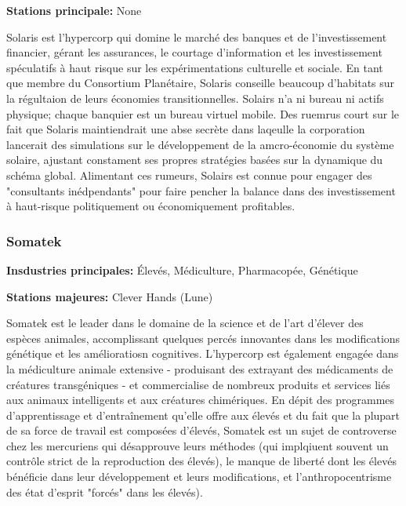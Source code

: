 \textbf{Stations principale:} None 

Solaris est l'hypercorp qui domine le marché des banques et de l'investissement financier, gérant les assurances, le courtage d'information et les investissement spéculatifs à haut risque sur les expérimentations culturelle et sociale. En tant que membre du Consortium Planétaire, Solaris conseille beaucoup d'habitats sur la régultaion de leurs économies transitionnelles. Solairs n'a ni bureau ni actifs physique; chaque banquier est un bureau virtuel mobile. Des ruemrus court sur le fait que Solaris maintiendrait une abse secrète dans laqeulle la corporation lancerait des simulations sur le développement de la amcro-économie du système solaire, ajustant constament ses propres stratégies basées sur la dynamique du schéma global. Alimentant ces rumeurs, Solairs est connue pour engager des "consultants inédpendants" pour faire pencher la balance dans des investissement à haut-risque politiquement ou économiquement profitables. 

\subsubsection{Somatek} \label{sec:somatek} 

\textbf{Insdustries principales:} Élevés, Médiculture, Pharmacopée, Génétique 

\textbf{Stations majeures:} Clever Hands (Lune) 

Somatek est le leader dans le domaine de la science et de l'art d'élever des espèces animales, accomplissant quelques percés innovantes dans les modifications génétique et les amélioratiosn cognitives. L'hypercorp est également engagée dans la médiculture animale extensive - produisant des extrayant des médicaments de créatures transgéniques - et commercialise de nombreux produits et services liés aux animaux intelligents et aux créatures chimériques. En dépit des programmes d'apprentissage et d'entraînement qu'elle offre aux élevés et du fait que la plupart de sa force de travail est composées d'élevés, Somatek est un sujet de controverse chez les mercuriens qui désapprouve leurs méthodes (qui implqiuent souvent un contrôle strict de la reproduction des élevés), le manque de liberté dont les élevés bénéficie dans leur développement et leurs modifications, et l'anthropocentrisme des état d'esprit "forcés" dans les élevés). 

